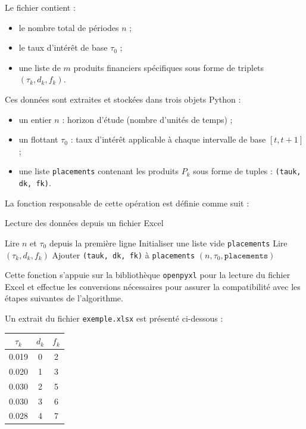 \documentclass[a4paper,11pt]{article}
\begin{document}
Le fichier contient :
\begin{itemize}
	\item le nombre total de périodes $n$ ;
	\item le taux d’intérêt de base $\tau_0$ ;
	\item une liste de $m$ produits financiers spécifiques sous forme de triplets $(\tau_k, d_k, f_k)$.
\end{itemize}

Ces données sont extraites et stockées dans trois objets Python :
\begin{itemize}
	\item un entier $n$ : horizon d’étude (nombre d’unités de temps) ;
	\item un flottant $\tau_0$ : taux d’intérêt applicable à chaque intervalle de base $[t, t+1]$ ;
	\item une liste \texttt{placements} contenant les produits $P_k$ sous forme de tuples : \texttt{(tauk, dk, fk)}.
\end{itemize}

La fonction responsable de cette opération est définie comme suit :

\begin{algorithm}[H]
	\caption{Lecture des données depuis un fichier Excel}
	\begin{algorithmic}[1]
		\State Lire $n$ et $\tau_0$ depuis la première ligne
		\State Initialiser une liste vide \texttt{placements}
		\State Lire $(\tau_k, d_k, f_k)$
		\State Ajouter \texttt{(tauk, dk, fk)} à \texttt{placements}
		\EndFor
		\State \Return $(n, \tau_0, \texttt{placements})$
		\EndFunction
	\end{algorithmic}
\end{algorithm}

Cette fonction s’appuie sur la bibliothèque \texttt{openpyxl} pour la lecture du fichier Excel et effectue les conversions nécessaires pour assurer la compatibilité avec les étapes suivantes de l’algorithme.

\vspace{0.5cm}
Un extrait du fichier \texttt{exemple.xlsx} est présenté ci-dessous :

\begin{center}
	\begin{tabular}{|c|c|c|}
		\hline
		$\tau_k$ & $d_k$ & $f_k$ \\
		\hline
		0.019    & 0     & 2     \\
		0.020    & 1     & 3     \\
		0.030    & 2     & 5     \\
		0.030    & 3     & 6     \\
		0.028    & 4     & 7     \\
		\hline
	\end{tabular}
	\label{tab:produits-exemple}
\end{center}
\end{document}
